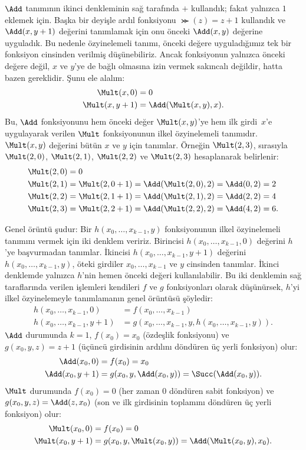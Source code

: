 \documentclass[../../../include/open-logic-section]{subfiles}
\begin{document}
$\Add$ tanımının ikinci denkleminin sağ tarafında $+$ kullandık; fakat
yalnızca $1$ eklemek için. Başka bir deyişle ardıl fonksiyonu
$\Succ(z)=z+1$ kullandık ve $\Add(x,y+1)$ değerini tanımlamak için onu
önceki $\Add(x,y)$ değerine uyguladık. Bu nedenle özyinelemeli tanımı,
önceki değere uyguladığımız tek bir fonksiyon cinsinden verilmiş
düşünebiliriz. Ancak fonksiyonun yalnızca önceki değere değil, $x$ ve
$y$'ye de bağlı olmasına izin vermek sakıncalı değildir, hatta bazen
gereklidir. Şunu ele alalım:
\begin{align*}
  \Mult(x,0) & = 0 \\
  \Mult(x,y+1) & = \Add(\Mult(x,y),x).
\end{align*}
Bu, $\Add$ fonksiyonunu hem önceki değer $\Mult(x,y)$'ye hem ilk
girdi~$x$'e uygulayarak verilen $\Mult$ fonksiyonunun ilkel
özyinelemeli tanımıdır. $\Mult(x,y)$ değerini bütün $x$ ve $y$ için
tanımlar. Örneğin $\Mult(2,3)$, sırasıyla $\Mult(2,0)$,
$\Mult(2,1)$, $\Mult(2,2)$ ve $\Mult(2,3)$ hesaplanarak belirlenir:
\begin{align*}
  \Mult(2,0) & = 0\\
  \Mult(2,1) & = \Mult(2,0+1) =
  \Add(\Mult(2,0), 2) = \Add(0, 2) = 2\\
  \Mult(2,2) & = \Mult(2,1+1) =
  \Add(\Mult(2,1), 2) = \Add(2, 2) = 4\\
  \Mult(2,3) & = \Mult(2,2+1) =
  \Add(\Mult(2,2), 2) = \Add(4, 2) = 6.
\end{align*}

Genel örüntü şudur: Bir $h(x_0,\dots,x_{k-1},y)$ fonksiyonunun ilkel
özyinelemeli tanımını vermek için iki denklem veririz. Birincisi
$h(x_0,\dots,x_{k-1},0)$ değerini $h$'ye başvurmadan tanımlar.
İkincisi $h(x_0,\dots,x_{k-1},y+1)$ değerini
$h(x_0,\dots,x_{k-1},y)$, öteki girdiler $x_0,\dots,x_{k-1}$ ve $y$
cinsinden tanımlar. İkinci denklemde yalnızca $h$'nin hemen önceki
değeri kullanılabilir. Bu iki denklemin sağ taraflarında verilen
işlemleri kendileri $f$ ve $g$ fonksiyonları olarak düşünürsek,
$h$'yi ilkel özyinelemeyle tanımlamanın genel örüntüsü şöyledir:
\begin{align*}
  h(x_0, \dots, x_{k-1}, 0) & = f(x_0, \dots, x_{k-1})\\
  h(x_0, \dots, x_{k-1}, y+1) & =
  g(x_0, \dots, x_{k-1}, y, h(x_0, \dots, x_{k-1}, y)).
\end{align*}
$\Add$ durumunda $k=1$, $f(x_0)=x_0$ (özdeşlik fonksiyonu) ve
$g(x_0,y,z)=z+1$ (üçüncü girdisinin ardılını döndüren üç yerli
fonksiyon) olur:
\begin{align*}
  \Add(x_0, 0) & = f(x_0) = x_0\\
  \Add(x_0, y+1) & = g(x_0, y, \Add(x_0, y)) =
  \Succ(\Add(x_0, y)).
\end{align*}
$\Mult$ durumunda $f(x_0)=0$ (her zaman $0$ döndüren sabit fonksiyon)
ve $g(x_0,y,z)=\Add(z,x_0)$ (son ve ilk girdisinin toplamını döndüren
üç yerli fonksiyon) olur:
\begin{align*}
  \Mult(x_0,0) & = f(x_0) = 0 \\
  \Mult(x_0,y+1) & = g(x_0, y, \Mult(x_0,y)) =
  \Add(\Mult(x_0,y), x_0).
\end{align*}
\end{document}
